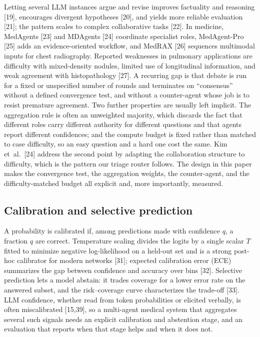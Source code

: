 \documentclass[12pt]{article}
\begin{document}
Letting several LLM instances argue and revise improves factuality and reasoning [19], encourages divergent hypotheses [20], and yields more reliable evaluation [21]; the pattern scales to complex collaborative tasks [22]. In medicine, MedAgents [23] and MDAgents [24] coordinate specialist roles, MedAgent-Pro [25] adds an evidence-oriented workflow, and MedRAX [26] sequences multimodal inputs for chest radiography. Reported weaknesses in pulmonary applications are difficulty with mixed-density nodules, limited use of longitudinal information, and weak agreement with histopathology [27]. A recurring gap is that debate is run for a fixed or unspecified number of rounds and terminates on \enquote{consensus} without a defined convergence test, and without a counter-agent whose job is to resist premature agreement. Two further properties are usually left implicit. The aggregation rule is often an unweighted majority, which discards the fact that different roles carry different authority for different questions and that agents report different confidences; and the compute budget is fixed rather than matched to case difficulty, so an easy question and a hard one cost the same. Kim et~al.~[24] address the second point by adapting the collaboration structure to difficulty, which is the pattern our triage router follows. The design in this paper makes the convergence test, the aggregation weights, the counter-agent, and the difficulty-matched budget all explicit and, more importantly, measured.

\subsection{Calibration and selective prediction}

A probability is calibrated if, among predictions made with confidence $q$, a fraction $q$ are correct. Temperature scaling divides the logits by a single scalar $T$ fitted to minimize negative log-likelihood on a held-out set and is a strong post-hoc calibrator for modern networks [31]; expected calibration error (ECE) summarizes the gap between confidence and accuracy over bins [32]. Selective prediction lets a model abstain: it trades coverage for a lower error rate on the answered subset, and the risk--coverage curve characterizes the trade-off [33]. LLM confidence, whether read from token probabilities or elicited verbally, is often miscalibrated [15,39], so a multi-agent medical system that aggregates several such signals needs an explicit calibration and abstention stage, and an evaluation that reports when that stage helps and when it does not.
\end{document}
